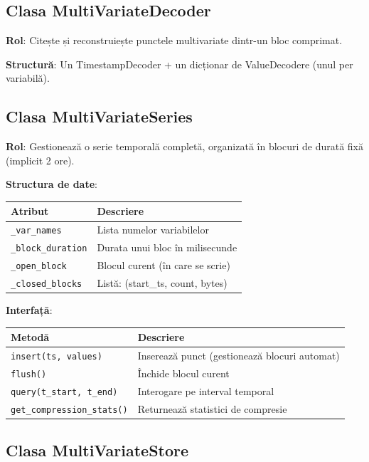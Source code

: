 \subsection{Clasa MultiVariateDecoder}

\textbf{Rol}: Citește și reconstruiește punctele multivariate dintr-un bloc comprimat.

\textbf{Structură}: Un TimestampDecoder + un dicționar de ValueDecodere (unul per variabilă).

\subsection{Clasa MultiVariateSeries}

\textbf{Rol}: Gestionează o serie temporală completă, organizată în blocuri de durată fixă (implicit 2 ore).

\textbf{Structura de date}:
\begin{center}
\begin{tabular}{|l|p{8cm}|}
\hline
\textbf{Atribut} & \textbf{Descriere} \\
\hline
\texttt{\_var\_names} & Lista numelor variabilelor \\
\texttt{\_block\_duration} & Durata unui bloc în milisecunde \\
\texttt{\_open\_block} & Blocul curent (în care se scrie) \\
\texttt{\_closed\_blocks} & Listă: (start\_ts, count, bytes) \\
\hline
\end{tabular}
\end{center}

\textbf{Interfață}:
\begin{center}
\begin{tabular}{|l|p{8cm}|}
\hline
\textbf{Metodă} & \textbf{Descriere} \\
\hline
\texttt{insert(ts, values)} & Inserează punct (gestionează blocuri automat) \\
\texttt{flush()} & Închide blocul curent \\
\texttt{query(t\_start, t\_end)} & Interogare pe interval temporal \\
\texttt{get\_compression\_stats()} & Returnează statistici de compresie \\
\hline
\end{tabular}
\end{center}

\subsection{Clasa MultiVariateStore}

